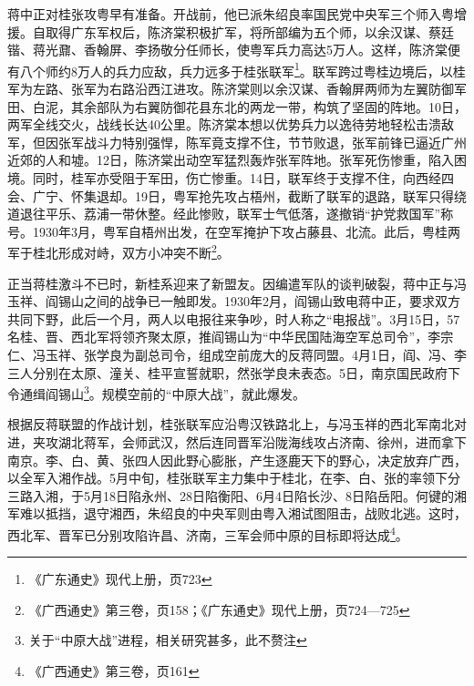蒋中正对桂张攻粤早有准备。开战前，他已派朱绍良率国民党中央军三个师入粤增援。自取得广东军权后，陈济棠积极扩军，将所部编为五个师，以余汉谋、蔡廷锴、蒋光鼐、香翰屏、李扬敬分任师长，使粤军兵力高达5万人。这样，陈济棠便有八个师约8万人的兵力应敌，兵力远多于桂张联军\footnote{《广东通史》现代上册，页723}。联军跨过粤桂边境后，以桂军为左路、张军为右路沿西江进攻。陈济棠则以余汉谋、香翰屏两师为左翼防御军田、白泥，其余部队为右翼防御花县东北的两龙一带，构筑了坚固的阵地。10日，两军全线交火，战线长达40公里。陈济棠本想以优势兵力以逸待劳地轻松击溃敌军，但因张军战斗力特别强悍，陈军竟支撑不住，节节败退，张军前锋已逼近广州近郊的人和墟。12日，陈济棠出动空军猛烈轰炸张军阵地。张军死伤惨重，陷入困境。同时，桂军亦受阻于军田，伤亡惨重。14日，联军终于支撑不住，向西经四会、广宁、怀集退却。19日，粤军抢先攻占梧州，截断了联军的退路，联军只得绕道退往平乐、荔浦一带休整。经此惨败，联军士气低落，遂撤销“护党救国军”称号。1930年3月，粤军自梧州出发，在空军掩护下攻占藤县、北流。此后，粤桂两军于桂北形成对峙，双方小冲突不断\footnote{《广西通史》第三卷，页158；《广东通史》现代上册，页724—725}。

正当蒋桂激斗不已时，新桂系迎来了新盟友。因编遣军队的谈判破裂，蒋中正与冯玉祥、阎锡山之间的战争已一触即发。1930年2月，阎锡山致电蒋中正，要求双方共同下野，此后一个月，两人以电报往来争吵，时人称之“电报战”。3月15日，57名桂、晋、西北军将领齐聚太原，推阎锡山为“中华民国陆海空军总司令”，李宗仁、冯玉祥、张学良为副总司令，组成空前庞大的反蒋同盟。4月1日，阎、冯、李三人分别在太原、潼关、桂平宣誓就职，然张学良未表态。5日，南京国民政府下令通缉阎锡山\footnote{关于“中原大战”进程，相关研究甚多，此不赘注}。规模空前的“中原大战”，就此爆发。

根据反蒋联盟的作战计划，桂张联军应沿粤汉铁路北上，与冯玉祥的西北军南北对进，夹攻湖北蒋军，会师武汉，然后连同晋军沿陇海线攻占济南、徐州，进而拿下南京。李、白、黄、张四人因此野心膨胀，产生逐鹿天下的野心，决定放弃广西，以全军入湘作战。5月中旬，桂张联军主力集中于桂北，在李、白、张的率领下分三路入湘，于5月18日陷永州、28日陷衡阳、6月4日陷长沙、8日陷岳阳。何键的湘军难以抵挡，退守湘西，朱绍良的中央军则由粤入湘试图阻击，战败北逃。这时，西北军、晋军已分别攻陷许昌、济南，三军会师中原的目标即将达成\footnote{《广西通史》第三卷，页161}。

